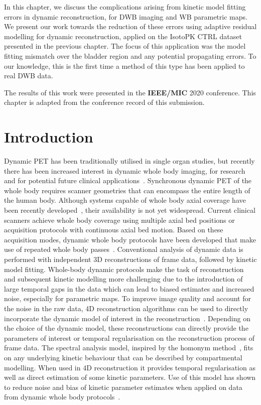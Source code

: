 In this chapter, we discuss the complications arising from kinetic model fitting errors in dynamic reconstruction, for DWB imaging and WB parametric maps. We present our work towards the reduction of these errors using adaptive residual modelling for dynamic reconstruction, applied on the IsotoPK CTRL dataset presented in the previous chapter. The focus of this application was the model fitting mismatch over the bladder region and any potential propagating errors. To our knowledge, this is the first time a method of this type has been applied to real DWB data.

The results of this work were presented in the \textbf{IEEE/MIC} 2020 conference. This chapter is adapted from the conference record of this submission.
\newpage
\section{Introduction}
Dynamic PET has been traditionally utilised in single organ studies, but recently there has been increased interest in dynamic whole body  imaging, for research and for potential future clinical applications~\cite{Lammertsma2017,Leahy2018,Rahmim2019,Fahrni2019}. Synchronous dynamic PET of the whole body requires scanner geometries that can encompass the entire length of the human body. Although systems capable of whole body axial coverage have been recently developed~\cite{Cherry2017}, their availability is not yet widespread. Current clinical scanners achieve whole body coverage using multiple axial bed positions or acquisition protocols with continuous axial bed motion. Based on these acquisition modes, dynamic whole body protocols have been developed that make use of repeated whole body passes~\cite{Karakatsanis2013}. 
Conventional analysis of dynamic data is performed with independent 3D reconstructions of frame data, followed by kinetic model fitting. Whole-body dynamic protocols make the task of reconstruction and subsequent kinetic modelling more challenging due to the introduction of large temporal gaps in the data which can lead to biased estimates and increased noise, especially for parametric maps. 
To improve image quality and account for the noise in the raw data, 4D reconstruction algorithms can be used to directly incorporate the dynamic model of interest in the reconstruction~\cite{Reader2014}.
Depending on the choice of the dynamic model, these reconstructions can directly provide the parameters of interest or temporal regularisation on the reconstruction process of frame data. The spectral analysis model, inspired by the homonym method~\cite{Cunningham1993}, fits on any underlying kinetic behaviour that can be described by compartmental modelling. When used in 4D reconstruction it provides temporal regularisation as well as direct estimation of some kinetic parameters. Use of this model has shown to reduce noise and bias of kinetic parameter estimates when applied on data from dynamic whole body protocols~\cite{Chalampalakis2019}.

